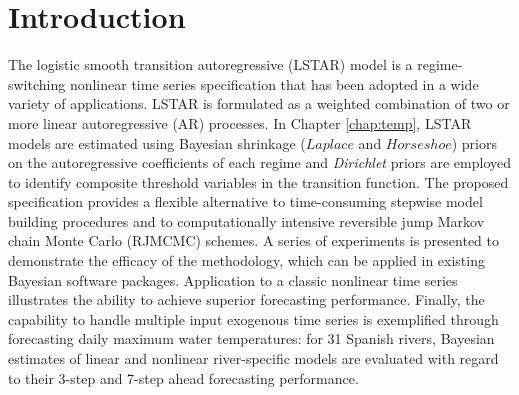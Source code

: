 \chapter{Introduction}
The logistic smooth transition autoregressive (LSTAR) model is a regime-switching nonlinear time series specification that has been adopted in a wide variety of applications. LSTAR is formulated as a weighted combination of two or more linear autoregressive (AR) processes. In Chapter \ref{chap:temp}, LSTAR models are estimated using Bayesian shrinkage ($Laplace$ and $Horseshoe$) priors on the autoregressive coefficients of each regime and \textit{Dirichlet} priors are employed to identify composite threshold variables in the transition function. The proposed specification provides a flexible alternative to time-consuming stepwise model building procedures and to computationally intensive reversible jump Markov chain Monte Carlo (RJMCMC) schemes. A series of experiments is presented to demonstrate the efficacy of the methodology, which can be applied in existing Bayesian software packages. Application to a classic nonlinear time series illustrates the ability to achieve superior forecasting performance. Finally, the capability to handle multiple input exogenous time series is exemplified through forecasting daily maximum water temperatures: for 31 Spanish rivers, Bayesian estimates of linear and nonlinear river-specific models are evaluated with regard to their 3-step and 7-step ahead forecasting performance.

